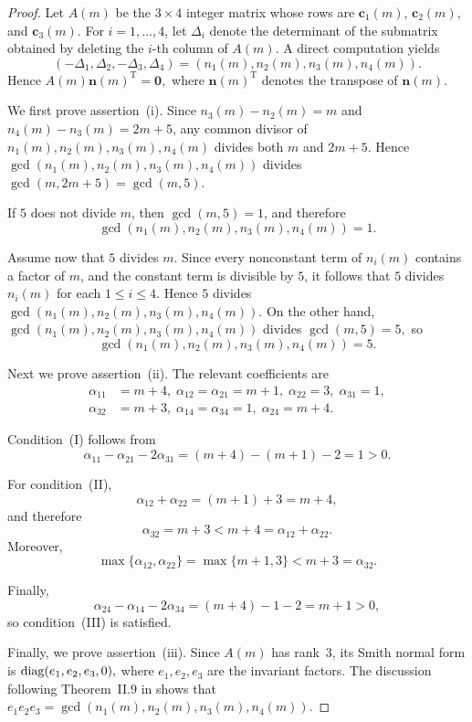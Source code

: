 \documentclass[12pt,a4paper]{amsart}
\theoremstyle{definition}
\begin{document}
\begin{proof}
Let $A(m)$ be the $3\times4$ integer matrix whose rows are
$\mathbf c_1(m)$, $\mathbf c_2(m)$, and $\mathbf c_3(m)$.
For $i=1,\ldots,4$, let $\Delta_i$ denote the determinant of the
submatrix obtained by deleting the $i$-th column of $A(m)$.
A direct computation yields
\[
(-\Delta_1,\Delta_2,-\Delta_3,\Delta_4)
=
(n_1(m),n_2(m),n_3(m),n_4(m)).
\]
Hence
$
A(m)\mathbf n(m)^{\mathrm T}=\mathbf 0,$ where $\mathbf n(m)^{\mathrm T}$ denotes the transpose of
$\mathbf n(m)$.

We first prove assertion~\textup{(i)}.
Since $n_3(m)-n_2(m)=m$ and $n_4(m)-n_3(m)=2m+5$,
any common divisor of
$n_1(m),n_2(m),n_3(m),n_4(m)$
divides both $m$ and $2m+5$.
Hence
$
\gcd(n_1(m),n_2(m),n_3(m),n_4(m))$
divides $\gcd(m,2m+5)
=
\gcd(m,5).$

If $5$ does not divide $m$, then $\gcd(m,5)=1$, and therefore
\[
\gcd(n_1(m),n_2(m),n_3(m),n_4(m))=1.
\]

Assume now that $5$ divides $m$. Since every nonconstant term of $n_i(m)$ contains a factor of $m$, and the constant term is divisible by $5$, it follows that $5$ divides $n_{i}(m)$ for each $1 \leq i \leq 4$.
Hence $5$ divides
$\gcd(n_1(m),n_2(m),n_3(m),n_4(m))$.
On the other hand,
$
\gcd(n_1(m),n_2(m),n_3(m),n_4(m))$ divides
$\gcd(m,5)=5,$ so
\[
\gcd(n_1(m),n_2(m),n_3(m),n_4(m))=5.
\]

Next we prove assertion~\textup{(ii)}.
The relevant coefficients are
\[
\begin{aligned}
\alpha_{11}&=m+4,\;
\alpha_{12}=\alpha_{21}=m+1,\;
\alpha_{22}=3,\;
\alpha_{31}=1,\\
\alpha_{32}&=m+3,\;
\alpha_{14}=\alpha_{34}=1,\;
\alpha_{24}=m+4.
\end{aligned}
\]

Condition~\textup{(I)} follows from
\[
\alpha_{11}-\alpha_{21}-2\alpha_{31}
=(m+4)-(m+1)-2=1>0.
\]

For condition~\textup{(II)},
\[
\alpha_{12}+\alpha_{22}
=(m+1)+3=m+4,
\]
and therefore
\[
\alpha_{32}=m+3<m+4=\alpha_{12}+\alpha_{22}.
\]
Moreover,
\[
\max\{\alpha_{12},\alpha_{22}\}
=\max\{m+1,3\}
<m+3=\alpha_{32}.
\]

Finally,
\[
\alpha_{24}-\alpha_{14}-2\alpha_{34}
=(m+4)-1-2=m+1>0,
\]
so condition~\textup{(III)} is satisfied.

Finally, we prove assertion~\textup{(iii)}.
Since $A(m)$ has rank~$3$, its Smith normal form is
${\rm diag}(e_1,e_2,e_3,0),$ where $e_1,e_2,e_3$ are the invariant factors.
The discussion following Theorem~II.9 in
\cite{Newman} shows that
$
e_1e_2e_3
=
\gcd(n_1(m),n_2(m),n_3(m),n_4(m)).$


\end{proof}
\end{document}
